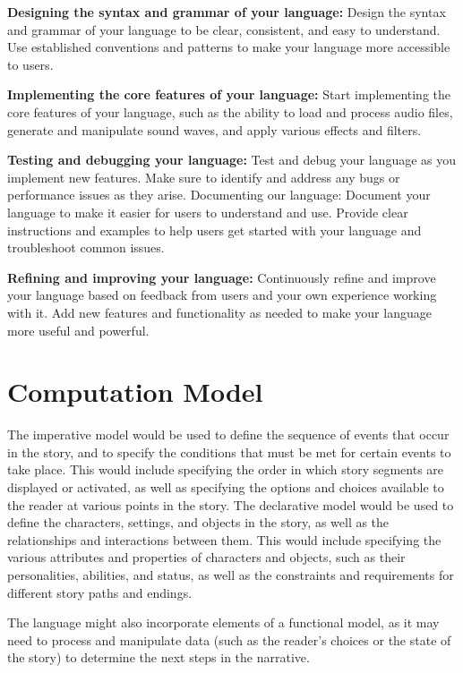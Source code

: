 \textbf {Designing the syntax and grammar of your language:} Design the syntax and grammar of your language to be clear, consistent, and easy to understand. Use established conventions and patterns to make your language more accessible to users. 

\textbf {Implementing the core features of your language:} Start implementing the core features of your language, such as the ability to load and process audio files, generate and manipulate sound waves, and apply various effects and filters.

\textbf {Testing and debugging your language:} Test and debug your language as you implement new features. Make sure to identify and address any bugs or performance issues as they arise. 
Documenting our language: Document your language to make it easier for users to understand and use. Provide clear instructions and examples to help users get started with your language and troubleshoot common issues. 

\textbf {Refining and improving your language:} Continuously refine and improve your language based on feedback from users and your own experience working with it. Add new features and functionality as needed to make your language more useful and powerful.

\section{Computation Model}

The imperative model would be used to define the sequence of events that occur in the story, and to specify the conditions that must be met for certain events to take place. This would include specifying the order in which story segments are displayed or activated, as well as specifying the options and choices available to the reader at various points in the story.
The declarative model would be used to define the characters, settings, and objects in the story, as well as the relationships and interactions between them. This would include specifying the various attributes and properties of characters and objects, such as their personalities, abilities, and status, as well as the constraints and requirements for different story paths and endings.

The language might also incorporate elements of a functional model, as it may need to process and manipulate data (such as the reader's choices or the state of the story) to determine the next steps in the narrative.

